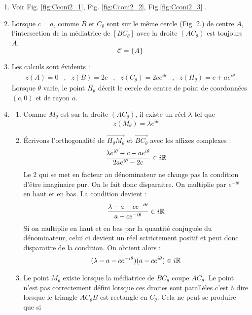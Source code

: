 \begin{enumerate}
 \item Voir Fig. \ref{fig:Cconi2_1}, Fig. \ref{fig:Cconi2_2}, Fig.\ref{fig:Cconi2_3} .
 \item Lorsque $c=a$, comme $B$ et $C_\theta$ sont sur le même cercle (Fig. 2.) de centre $A$, l'intersection de la médiatrice de $[BC_\theta]$ avec la droite $(AC_\theta)$ est toujours $A$.
\begin{displaymath}
 \mathcal C = \{A\}
\end{displaymath}
\item Les calculs sont évidents :
\begin{align*}
 z(A)=0 &,& z(B)=2c &,& z(C_\theta)=2ce^{i\theta} &,& z(H_\theta)=c+ae^{i\theta} 
\end{align*}
Lorsque $\theta$ varie, le point $H_\theta$ décrit le cercle de centre de point de coordonnées $(c,0)$ et de rayon $a$.
\item 
\begin{enumerate}
 \item Comme $M_\theta$ est sur la droite $(AC_\theta)$, il existe un réel $\lambda$ tel que
\begin{displaymath}
 z(M_\theta) = \lambda e^{i\theta}
\end{displaymath}
\item \'Ecrivons l'orthogonalité de $\overrightarrow{H_\theta M_\theta}$ et $\overrightarrow{BC_\theta}$ avec les affixes complexes :
\begin{displaymath}
 \frac{\lambda e^{i\theta} -c - a e^{i\theta}}{2ae^{i\theta}-2c} \in i\mathbb{R}
\end{displaymath}
Le $2$ qui se met en facteur au dénominateur ne change pas la condition d'être imaginaire pur. On le fait donc disparaitre. On multiplie par $e^{-i\theta}$ en haut et en bas. La condition devient :
\begin{displaymath}
 \frac{\lambda -a -c e^{-i\theta} }{a-ce^{-i\theta}} \in i\mathbb{R}
\end{displaymath}
Si on multiplie en haut et en bas par la quantité conjuguée du dénominateur, celui ci devient un réel sctrictement positif et peut donc disparaitre de la condition. On obtient alors :
\begin{displaymath}
 (\lambda -a -c e^{-i\theta})(a-ce^{i\theta}) \in i\mathbb{R}
\end{displaymath}
\item Le point $M_\theta$ existe lorsque la médiatrice de $BC_\theta$ coupe $AC_\theta$. Le point n'est pas correctement défini lorsque ces droites sont parallèles c'est à dire lorsque le triangle $AC_\theta B$ est rectangle en $C_\theta$. Cela ne peut se produire que si 

\end{enumerate}
\end{enumerate}
